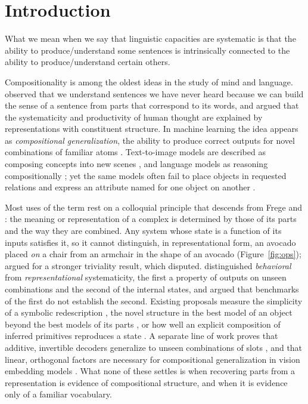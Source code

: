 \documentclass[10pt]{article}
\theoremstyle{plain}
\theoremstyle{remark}
\begin{document}
\section{Introduction}
\label{sec:intro}

\epigraph{What we mean when we say that linguistic capacities are systematic is that the ability to produce/understand some sentences is intrinsically connected to the ability to produce/understand certain others.}{\citet{fodor1988}}

Compositionality is among the oldest ideas in the study of mind and language. \citet{frege1923} observed that we understand sentences we have never heard because we can build the sense of a sentence from parts that correspond to its words, and \citet{fodor1988} argued that the systematicity and productivity of human thought are explained by representations with constituent structure. In machine learning the idea appears as \emph{compositional generalization}, the ability to produce correct outputs for novel combinations of familiar atoms \citep{lake2018,keysers2020,kim2020cogs}. Text-to-image models are described as composing concepts into new scenes \citep{ramesh2021,okawa2023}, and language models as reasoning compositionally \citep{press2023}; yet the same models often fail to place objects in requested relations \citep{conwell2022} and express an attribute named for one object on another \citep{rassin2022}.

Most uses of the term rest on a colloquial principle that descends from Frege and \citet{montague1970}: the meaning or representation of a complex is determined by those of its parts and the way they are combined. Any system whose state is a function of its inputs satisfies it, so it cannot distinguish, in representational form, an avocado placed \emph{on} a chair from an armchair in the shape of an avocado (Figure~\ref{fig:ops}); \citet{zadrozny1994} argued for a stronger triviality result, which \citet{westerstahl1998} disputed. \citet{vegner2025} distinguished \emph{behavioral} from \emph{representational} systematicity, the first a property of outputs on unseen combinations and the second of the internal states, and argued that benchmarks of the first do not establish the second. Existing proposals measure the simplicity of a symbolic redescription \citep{elmoznino2024}, the novel structure in the best model of an object beyond the best models of its parts \citep{elmoznino2026}, or how well an explicit composition of inferred primitives reproduces a state \citep{andreas2019}. A separate line of work proves that additive, invertible decoders generalize to unseen combinations of slots \citep{lachapelle2023,wiedemer2024}, and that linear, orthogonal factors are necessary for compositional generalization in vision embedding models \citep{uselis2026}. What none of these settles is when recovering parts from a representation is evidence of compositional structure, and when it is evidence only of a familiar vocabulary.
\end{document}

